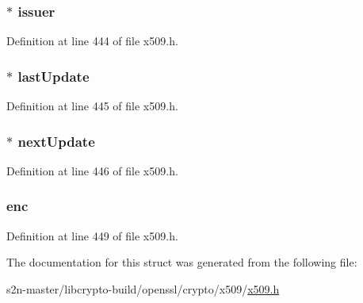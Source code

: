 \subsubsection[{\texorpdfstring{issuer}{issuer}}]{ $\ast$ issuer}\hypertarget{struct_x509__crl__info__st_a45017edc554e7984544678696c7a2e75}{}\label{struct_x509__crl__info__st_a45017edc554e7984544678696c7a2e75}


Definition at line 444 of file x509.\+h.

\subsubsection[{\texorpdfstring{last\+Update}{lastUpdate}}]{ $\ast$ last\+Update}\hypertarget{struct_x509__crl__info__st_a0525036a9b3d81d5ad97bf5aaa001a62}{}\label{struct_x509__crl__info__st_a0525036a9b3d81d5ad97bf5aaa001a62}


Definition at line 445 of file x509.\+h.

\subsubsection[{\texorpdfstring{next\+Update}{nextUpdate}}]{ $\ast$ next\+Update}\hypertarget{struct_x509__crl__info__st_a22fae8c5f603ba7fad887d5b70c915ba}{}\label{struct_x509__crl__info__st_a22fae8c5f603ba7fad887d5b70c915ba}


Definition at line 446 of file x509.\+h.

\subsubsection[{\texorpdfstring{enc}{enc}}]{ enc}\hypertarget{struct_x509__crl__info__st_a6d03127d2bcfc5727232717a5ba76f91}{}\label{struct_x509__crl__info__st_a6d03127d2bcfc5727232717a5ba76f91}


Definition at line 449 of file x509.\+h.



The documentation for this struct was generated from the following file\+:\begin{DoxyCompactItemize}
\item 
s2n-\/master/libcrypto-\/build/openssl/crypto/x509/\hyperlink{crypto_2x509_2x509_8h}{x509.\+h}\end{DoxyCompactItemize}
